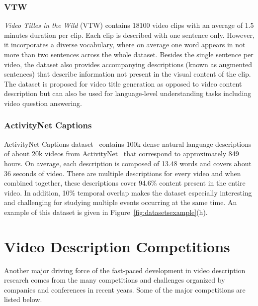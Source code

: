 \documentclass[10pt,journal,compsoc]{IEEEtran}
\begin{document}
\subsubsection{VTW}
\textit{Video Titles in the Wild} (VTW) \cite{zeng2016generation} contains 18100 video clips with an average of 1.5 minutes duration per clip. Each clip is described with one sentence only. However, it incorporates a diverse vocabulary, where on average one word appears in not more than two sentences across the whole dataset. Besides the single sentence per video, the dataset also provides accompanying descriptions (known as augmented sentences) that describe information not present in the visual content of the clip. The dataset is proposed for video title generation as opposed to video content description but can also be used for language-level understanding tasks including video question answering. 

\subsubsection{ActivityNet Captions}
\label{subsec:activitynetcap}
ActivityNet Captions dataset~\cite{krishna2017dense} contains 100k dense natural language descriptions of about 20k videos from ActivityNet~\cite{zhu2007stochastic} that correspond to approximately 849 hours. On average, each description is composed of 13.48 words and covers about 36 seconds of video. There are multiple descriptions for every video and when combined together, these descriptions cover 94.6\% content present in the entire video. In addition, 10\% temporal overlap  makes the dataset especially interesting and challenging for studying multiple events occurring at the same time. An example of this dataset is given in Figure~\ref{fig:datasetsexample}(h).

\section{Video Description Competitions}
\label{videocompetitions}
Another major driving force of the fast-paced development in video description research comes from the many competitions and challenges organized by companies and conferences in recent years. Some of the major competitions are listed below.
\end{document}
